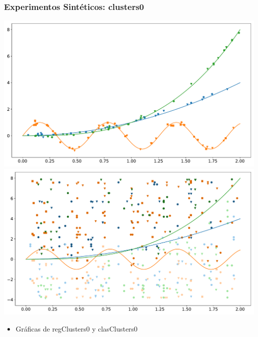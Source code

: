 \documentclass[aspectratio=43,spanish]{beamer}
\newcommand{\fdata}[1]{\textsf{#1}}
\begin{document}
\begin{frame}
{\begin{tabular}{l*{5}{c}}
               \bottomrule
              \end{tabular}
          }
      

\end{frame}


\begin{frame}
      \frametitle{Experimentos Sintéticos: \fdata{clusters0}}

      \includegraphics[width=.5\textwidth]{Chapter6/IGPL2022/regClusters__0.pdf}%
      \includegraphics[width=.5\textwidth]{Chapter6/IGPL2022/clasClusters__0.pdf}
      \begin{itemize}
            \item Gráficas de \fdata{regClusters0} y \fdata{clasClusters0}
      \end{itemize}    

\end{frame}
\end{document}
